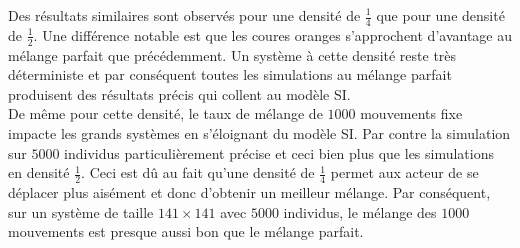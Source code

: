 Des résultats similaires sont observés pour une densité de $\frac{1}{4}$ que pour une densité de $\frac{1}{2}$. Une différence notable est que les coures oranges s'approchent d'avantage au mélange parfait que précédemment. Un système à cette densité reste très déterministe et par conséquent toutes les simulations au mélange parfait produisent des résultats précis qui collent au modèle SI.\\

De même pour cette densité, le taux de mélange de $1000$ mouvements fixe impacte les grands systèmes en s'éloignant du modèle SI. Par contre la simulation sur $5000$ individus particulièrement précise et ceci bien plus que les simulations en densité $\frac{1}{2}$. Ceci est dû au fait qu'une densité de $\frac{1}{4}$ permet aux acteur de se déplacer plus aisément et donc d'obtenir un meilleur mélange. Par conséquent, sur un système de taille $141\times 141$ avec $5000$ individus, le mélange des $1000$ mouvements est presque aussi bon que le mélange parfait.

\newpage

